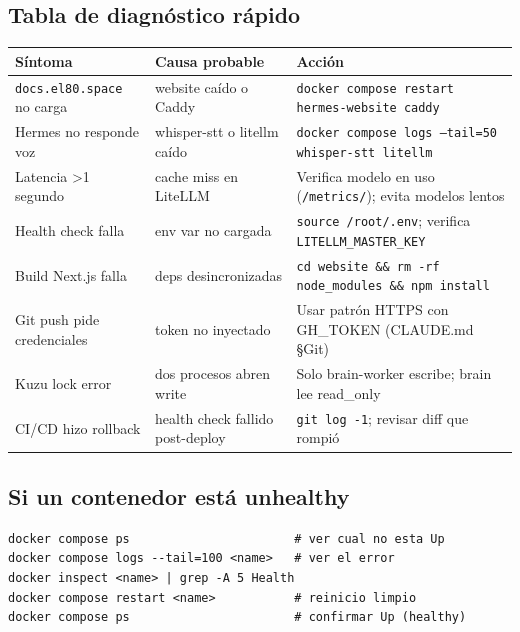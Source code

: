 \documentclass[11pt,a4paper]{article}
\begin{document}
\subsection{Tabla de diagnóstico rápido}

\begin{center}
\begin{tabularx}{0.95\textwidth}{|l|X|X|}
\hline
\rowcolor{manualred}\color{white}\textbf{Síntoma} & \color{white}\textbf{Causa probable} & \color{white}\textbf{Acción}\\
\hline
\texttt{docs.el80.space} no carga & website caído o Caddy & \texttt{docker compose restart hermes-website caddy}\\
Hermes no responde voz & whisper-stt o litellm caído & \texttt{docker compose logs --tail=50 whisper-stt litellm}\\
Latencia \textgreater 1 segundo & cache miss en LiteLLM & Verifica modelo en uso (\texttt{/metrics/}); evita modelos lentos\\
Health check falla & env var no cargada & \texttt{source /root/.env}; verifica \texttt{LITELLM\_MASTER\_KEY}\\
Build Next.js falla & deps desincronizadas & \texttt{cd website \&\& rm -rf node\_modules \&\& npm install}\\
Git push pide credenciales & token no inyectado & Usar patrón HTTPS con GH\_TOKEN (CLAUDE.md \S Git)\\
Kuzu lock error & dos procesos abren write & Solo brain-worker escribe; brain lee read\_only\\
CI/CD hizo rollback & health check fallido post-deploy & \texttt{git log -1}; revisar diff que rompió\\
\hline
\end{tabularx}
\end{center}

\subsection{Si un contenedor está unhealthy}

\begin{lstlisting}[language=bashx]
docker compose ps                       # ver cual no esta Up
docker compose logs --tail=100 <name>   # ver el error
docker inspect <name> | grep -A 5 Health
docker compose restart <name>           # reinicio limpio
docker compose ps                       # confirmar Up (healthy)
\end{lstlisting}
\end{document}
